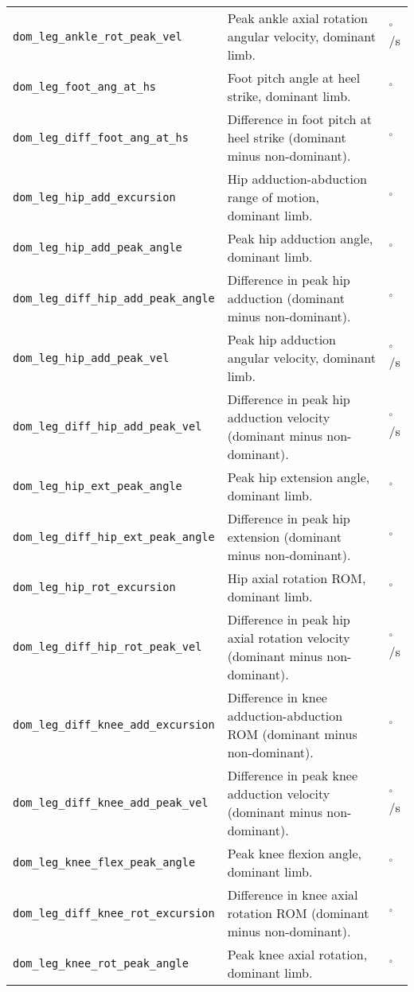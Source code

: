 \begin{longtable}{@{}l p{} l@{}}
    \texttt{dom\_leg\_ankle\_rot\_peak\_vel} & Peak ankle axial rotation angular velocity, dominant limb. & $^\circ$/s \\
    \texttt{dom\_leg\_foot\_ang\_at\_hs} & Foot pitch angle at heel strike, dominant limb. & $^\circ$ \\
    \texttt{dom\_leg\_diff\_foot\_ang\_at\_hs} & Difference in foot pitch at heel strike (dominant minus non-dominant). & $^\circ$ \\
    \texttt{dom\_leg\_hip\_add\_excursion} & Hip adduction-abduction range of motion, dominant limb. & $^\circ$ \\
    \texttt{dom\_leg\_hip\_add\_peak\_angle} & Peak hip adduction angle, dominant limb. & $^\circ$ \\
    \texttt{dom\_leg\_diff\_hip\_add\_peak\_angle} & Difference in peak hip adduction (dominant minus non-dominant). & $^\circ$ \\
    \texttt{dom\_leg\_hip\_add\_peak\_vel} & Peak hip adduction angular velocity, dominant limb. & $^\circ$/s \\
    \texttt{dom\_leg\_diff\_hip\_add\_peak\_vel} & Difference in peak hip adduction velocity (dominant minus non-dominant). & $^\circ$/s \\
    \texttt{dom\_leg\_hip\_ext\_peak\_angle} & Peak hip extension angle, dominant limb. & $^\circ$ \\
    \texttt{dom\_leg\_diff\_hip\_ext\_peak\_angle} & Difference in peak hip extension (dominant minus non-dominant). & $^\circ$ \\
    \texttt{dom\_leg\_hip\_rot\_excursion} & Hip axial rotation ROM, dominant limb. & $^\circ$ \\
    \texttt{dom\_leg\_diff\_hip\_rot\_peak\_vel} & Difference in peak hip axial rotation velocity (dominant minus non-dominant). & $^\circ$/s \\
    \texttt{dom\_leg\_diff\_knee\_add\_excursion} & Difference in knee adduction-abduction ROM (dominant minus non-dominant). & $^\circ$ \\
    \texttt{dom\_leg\_diff\_knee\_add\_peak\_vel} & Difference in peak knee adduction velocity (dominant minus non-dominant). & $^\circ$/s \\
    \texttt{dom\_leg\_knee\_flex\_peak\_angle} & Peak knee flexion angle, dominant limb. & $^\circ$ \\
    \texttt{dom\_leg\_diff\_knee\_rot\_excursion} & Difference in knee axial rotation ROM (dominant minus non-dominant). & $^\circ$ \\
    \texttt{dom\_leg\_knee\_rot\_peak\_angle} & Peak knee axial rotation, dominant limb. & $^\circ$ \\

\end{longtable}
